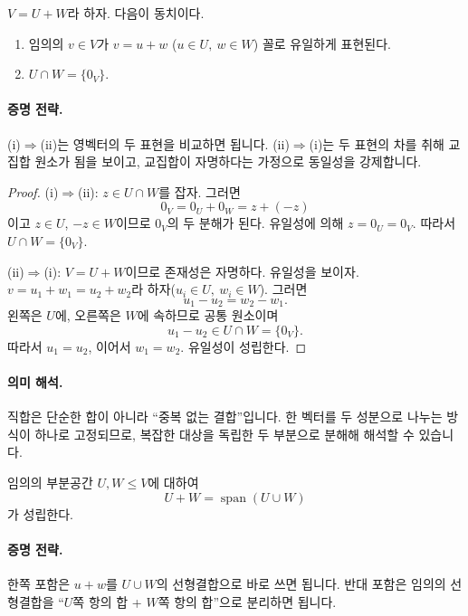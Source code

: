 \begin{theorem}
$V=U+W$라 하자. 다음이 동치이다.
\begin{enumerate}[label=(\roman*)]
\item 임의의 $v\in V$가 $v=u+w$ ($u\in U,\ w\in W$) 꼴로 유일하게 표현된다.
\item $U\cap W=\{0_V\}$.
\end{enumerate}
\end{theorem}

\paragraph{증명 전략.}
(i)$\Rightarrow$(ii)는 영벡터의 두 표현을 비교하면 됩니다. (ii)$\Rightarrow$(i)는 두 표현의 차를 취해 교집합 원소가 됨을 보이고, 교집합이 자명하다는 가정으로 동일성을 강제합니다.

\begin{proof}
(i)$\Rightarrow$(ii): $z\in U\cap W$를 잡자. 그러면
\[
0_V=0_U+0_W=z+(-z)
\]
이고 $z\in U$, $-z\in W$이므로 $0_V$의 두 분해가 된다. 유일성에 의해 $z=0_U=0_V$. 따라서 $U\cap W=\{0_V\}$.

(ii)$\Rightarrow$(i): $V=U+W$이므로 존재성은 자명하다. 유일성을 보이자. $v=u_1+w_1=u_2+w_2$라 하자($u_i\in U,\ w_i\in W$). 그러면
\[
u_1-u_2=w_2-w_1.
\]
왼쪽은 $U$에, 오른쪽은 $W$에 속하므로 공통 원소이며
\[
u_1-u_2\in U\cap W=\{0_V\}.
\]
따라서 $u_1=u_2$, 이어서 $w_1=w_2$. 유일성이 성립한다.
\end{proof}

\paragraph{의미 해석.}
직합은 단순한 합이 아니라 ``중복 없는 결합''입니다. 한 벡터를 두 성분으로 나누는 방식이 하나로 고정되므로, 복잡한 대상을 독립한 두 부분으로 분해해 해석할 수 있습니다.

\begin{theorem}[합공간의 생성 표현]
임의의 부분공간 $U,W\le V$에 대하여
\[
U+W=\operatorname{span}(U\cup W)
\]
가 성립한다.
\end{theorem}

\paragraph{증명 전략.}
한쪽 포함은 $u+w$를 $U\cup W$의 선형결합으로 바로 쓰면 됩니다. 반대 포함은 임의의 선형결합을 ``$U$쪽 항의 합 + $W$쪽 항의 합''으로 분리하면 됩니다.

